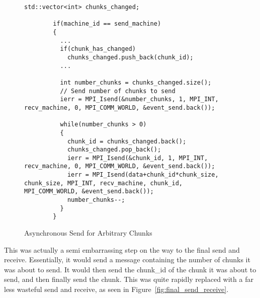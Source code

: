\documentclass[../thesis.tex]{subfiles}
\begin{document}
    \begin{figure}[htbp]
      \centering

      \lstset{language=cpp}  
      \begin{lstlisting}[tabsize=2]
        std::vector<int> chunks_changed;

        if(machine_id == send_machine)
        {
          ...
          if(chunk_has_changed)
            chunks_changed.push_back(chunk_id);
          ...

          int number_chunks = chunks_changed.size();
          // Send number of chunks to send
          ierr = MPI_Isend(&number_chunks, 1, MPI_INT, recv_machine, 0, MPI_COMM_WORLD, &event_send.back());

          while(number_chunks > 0)
          {
            chunk_id = chunks_changed.back();
            chunks_changed.pop_back();
            ierr = MPI_Isend(&chunk_id, 1, MPI_INT, recv_machine, 0, MPI_COMM_WORLD, &event_send.back());
            ierr = MPI_Isend(data+chunk_id*chunk_size, chunk_size, MPI_INT, recv_machine, chunk_id, MPI_COMM_WORLD, &event_send.back());
            number_chunks--;
          }
        }
        \end{lstlisting}

      \caption{Asynchronous Send for Arbitrary Chunks}
      \label{fig:async_send_of_arbitrary_chunks}
    \end{figure}

    This was actually a semi embarrassing step on the way to the final send and receive. Essentially, it would send a message containing the number of chunks it was about to send. It would then send the chunk\_id of the chunk it was about to send, and then finally send the chunk. This was quite rapidly replaced with a far less wasteful send and receive, as seen in Figure~\ref{fig:final_send_receive}.
\end{document}
